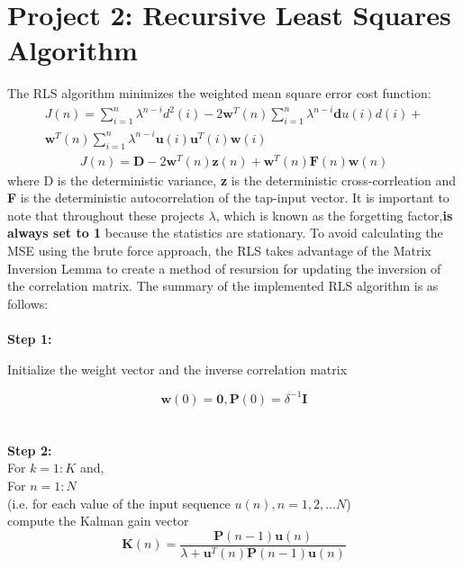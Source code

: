 \documentclass[journal]{IEEEtran}
\begin{document}
\section{Project 2: Recursive Least Squares Algorithm}
The RLS algorithm minimizes the weighted mean square error cost function:
\begin{align*}
  J(n)=\sum_{i=1}^{n}\lambda^{n-i}d^2(i)-2\boldsymbol{w}^T(n)\sum_{i=1}^{n}\lambda^{n-i}\boldsymbol{d}{u}(i)d(i)+ \\ \boldsymbol{w}^T(n)\sum_{i=1}^{n}\lambda^{n-i}\boldsymbol{u}(i)\boldsymbol{u}^T(i)\boldsymbol{w}(i)
\end{align*}
\begin{align*}
  J(n)= \boldsymbol{D} - 2\boldsymbol{w}^T(n)\boldsymbol{z}(n)+\boldsymbol{w}^T(n)\boldsymbol{F}(n)\boldsymbol{w}(n)
\end{align*}
where D is the deterministic variance, \textbf{z} is the deterministic cross-corrleation and \textbf{F}
is the deterministic autocorrelation of the tap-input vector. It is important to note that throughout these projects $\lambda$,
which is known as the forgetting factor,\textbf{is always set to 1} because the statistics are stationary. To avoid calculating the MSE using the brute force
approach, the RLS takes advantage of the Matrix Inversion Lemma to create a method of resursion for updating the inversion of the correlation matrix.
The summary of the implemented RLS algorithm is as follows:\\
\\
\textbf{Step 1:} \\ \vspace{-5mm}
\begin{center} Initialize the weight vector and the inverse correlation matrix\end{center}
$$\boldsymbol{w}(0) = \boldsymbol{0},  \boldsymbol{P}(0) = \delta^{-1}\boldsymbol{I}$$\\
\vspace{-7mm}\\\textbf{Step 2:}\\
For $k = 1:K$ and,\\
For $n = 1:N$\\
(i.e. for each value of the input sequence $u(n), n = 1,2,...N$)
\\ compute the Kalman gain vector
\begin{equation}
  \boldsymbol{K}(n)= \dfrac{\boldsymbol{P}(n-1)\boldsymbol{u}(n)}{\lambda+\boldsymbol{u}^T(n)\boldsymbol{P}(n-1)\boldsymbol{u}(n)}
\end{equation}
\end{document}
